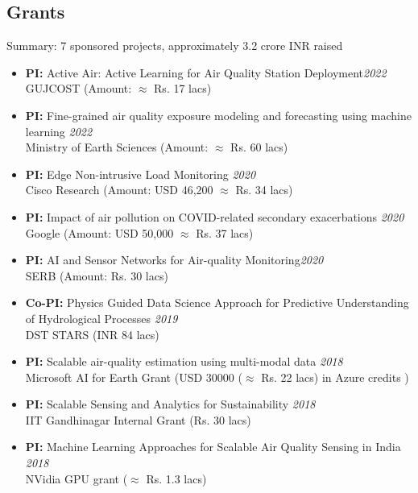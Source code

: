 \documentclass[letter,10pt]{article}
\begin{document}
\subsection*{\sc \textbf{Grants}\hspace{5pt}\noindent\hrulefill}
Summary: 7 sponsored projects, approximately 3.2 crore INR raised
\begin{itemize}
 \ifcvshort\else
 \item[]{\textbf{PI: }Active Air: Active Learning for Air Quality Station Deployment}\hfill\textit{2022} \\
        GUJCOST (Amount: $\approx$ Rs. 17 lacs)
 \fi
      \item[]{\textbf{PI: }Fine-grained air quality exposure modeling and forecasting using machine learning }\hfill\textit{2022} \\
        Ministry of Earth Sciences (Amount: $\approx$ Rs. 60 lacs)
    \item[]{\textbf{PI: }Edge Non-intrusive Load Monitoring  }\hfill\textit{2020} \\
    Cisco Research (Amount: USD 46,200 $\approx$ Rs. 34 lacs)
    \item[]{\textbf{PI: }Impact of air pollution on COVID-related secondary exacerbations  }\hfill\textit{2020} \\
    Google (Amount: USD 50,000 $\approx$ Rs. 37 lacs)
    \ifcvshort\else
    \item[]{\textbf{PI: }AI and Sensor Networks for Air-quality Monitoring}\hfill\textit{2020} \\
    SERB (Amount: Rs. 30 lacs)
    
    \item[]{\textbf{Co-PI: }Physics Guided Data Science Approach for Predictive Understanding of Hydrological Processes }\hfill\textit{2019}\\
    DST STARS (INR 84 lacs)
    \item[]{\textbf{PI: }Scalable air-quality estimation using multi-modal data \hfill\textit{2018}\\Microsoft AI for Earth Grant (USD 30000 ($\approx$ Rs. 22 lacs) in Azure credits )} 
    \item[]{\textbf{PI: }Scalable Sensing and Analytics for Sustainability \hfill\textit{2018} \\
    IIT Gandhinagar Internal Grant (Rs. 30 lacs)} 
    \item[]{\textbf{PI: }Machine Learning Approaches for Scalable Air Quality Sensing in India} \hfill\textit{2018}\\
    NVidia GPU grant ($\approx$ Rs. 1.3 lacs)
    \fi
\end{itemize}
\end{document}
